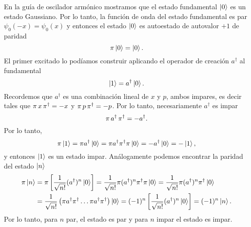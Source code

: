 \documentclass[10pt, a4paper]{article}
\numberwithin{equation}{subsection}
\begin{document}
En la guía de oscilador armónico mostramos que el estado fundamental $\ket{0}$
es un estado Gaussiano. Por lo tanto, la función de onda del estado fundamental
es par $\psi_{0}(-x) = \psi_{0}(x)$ y entonces el estado $\ket{0}$ es
autoestado de autovalor $+1$ de paridad
\begin{equation}
  \pi\ket{0} = \ket{0}.
\end{equation}
El primer excitado lo podíamos construir aplicando el operador de creación
$a^\dagger$ al fundamental
\begin{equation}
  \ket{1} = a^\dagger\ket{0}.
\end{equation}
Recordemos que $a^\dagger$ es una combinación lineal de $x$ y $p$, ambos
impares, es decir tales que $\pi\,x\,\pi^\dagger = -x$ y
$\pi\,p\,\pi^\dagger = -p$. Por lo tanto, necesariamente
$a^\dagger$ es impar
\begin{equation}
  \pi\,a^\dagger\,\pi^\dagger = -a^\dagger.
\end{equation}
Por lo tanto,
\begin{equation}
  \pi\ket{1} = \pi a^\dagger \ket{0} = \pi a^\dagger
  \pi^\dagger \pi \ket{0} = -a^\dagger\ket{0} = -\ket{1},
\end{equation}
y entonces $\ket{1}$ es un estado impar. Análogamente podemos encontrar la
paridad del estado $\ket{n}$
\begin{align}
  \pi\ket{n}
  &= \pi\left[\frac{1}{\sqrt{n!}}(a^\dagger)^n\ket{0}\right]
  = \frac{1}{\sqrt{n!}}\pi(a^\dagger)^n\pi^\dagger\pi\ket{0}
  = \frac{1}{\sqrt{n!}}\pi(a^\dagger)^n\pi^\dagger\ket{0}
    \nonumber \\
  &= \frac{1}{\sqrt{n!}}\left(\pi a^\dagger\pi^\dagger
    \dots \pi a^\dagger\pi^\dagger\right)\ket{0}
  = (-1)^n \left[\frac{1}{\sqrt{n!}}(a^\dagger)^n\ket{0}\right]
  = (-1)^n \ket{n}.
\end{align}
Por lo tanto, para $n$ par, el estado es par y para $n$ impar el estado es
impar.

\end{document}
